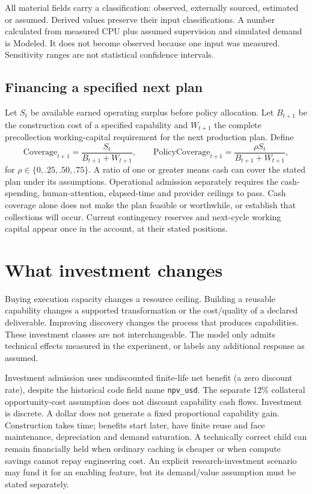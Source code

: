 \documentclass[11pt,a4paper]{article}
\newcommand{\modl}{\textsf{Modeled}}
\newcommand{\code}[1]{\texttt{\small #1}}
\begin{document}
All material fields carry a classification: observed, externally sourced, estimated or assumed. Derived values preserve their input classifications. A number calculated from measured CPU plus assumed supervision and simulated demand is \modl. It does not become observed because one input was measured. Sensitivity ranges are not statistical confidence intervals.

\subsection{Financing a specified next plan}
Let $S_t$ be available earned operating surplus before policy allocation. Let $B_{t+1}$ be the construction cost of a specified capability and $W_{t+1}$ the complete precollection working-capital requirement for the next production plan. Define
\begin{equation}
\mathrm{Coverage}_{t+1}=\frac{S_t}{B_{t+1}+W_{t+1}},\qquad
\mathrm{PolicyCoverage}_{t+1}=\frac{\rho S_t}{B_{t+1}+W_{t+1}},
\end{equation}
for $\rho\in\{0,.25,.50,.75\}$. A ratio of one or greater means cash can cover the stated plan under its assumptions. Operational admission separately requires the cash-spending, human-attention, elapsed-time and provider ceilings to pass. Cash coverage alone does not make the plan feasible or worthwhile, or establish that collections will occur. Current contingency reserves and next-cycle working capital appear once in the account, at their stated positions.

\section{What investment changes}
\label{sec:investment}
Buying execution capacity changes a resource ceiling. Building a reusable capability changes a supported transformation or the cost/quality of a declared deliverable. Improving discovery changes the process that produces capabilities. These investment classes are not interchangeable. The model only admits technical effects measured in the experiment, or labels any additional response as assumed.

Investment admission uses undiscounted finite-life net benefit (a zero discount rate), despite the historical code field name \code{npv\_usd}. The separate 12\% collateral opportunity-cost assumption does not discount capability cash flows. Investment is discrete. A dollar does not generate a fixed proportional capability gain. Construction takes time; benefits start later, have finite reuse and face maintenance, depreciation and demand saturation. A technically correct child can remain financially held when ordinary caching is cheaper or when compute savings cannot repay engineering cost. An explicit research-investment scenario may fund it for an enabling feature, but its demand/value assumption must be stated separately.
\end{document}
